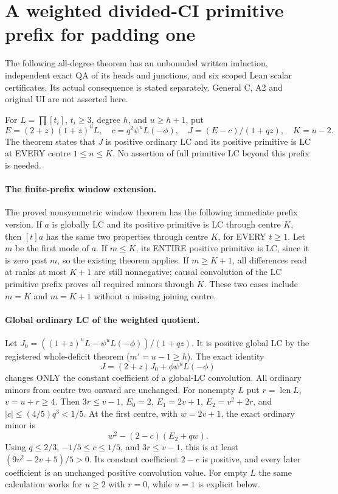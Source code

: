 \section{A weighted divided-CI primitive prefix for padding one}
The following all-degree theorem has an unbounded written induction,
independent exact QA of its heads and junctions, and six scoped Lean
scalar certificates. Its actual consequence is stated separately.
General C, A2 and original UI are not asserted here.

For $L=\prod[t_i]$, $t_i\ge3$, degree $h$, and $u\ge h+1$, put
\[
 E=(2+z)(1+z)^uL,\quad c=q^2\psi^uL(-\phi),\quad
 J=(E-c)/(1+qz),\quad K=u-2.
\]
The theorem states that $J$ is positive ordinary LC and
its positive primitive is LC at EVERY centre $1\le n\le K$.
No assertion of full primitive LC beyond this prefix is needed.

\paragraph{The finite-prefix window extension.}
The proved nonsymmetric window theorem has the following immediate
prefix version. If $a$ is globally LC and its positive primitive
is LC through centre $K$, then $[t]a$ has the same two properties
through centre $K$, for EVERY $t\ge1$.
Let $m$ be the first mode of $a$. If $m\le K$, its ENTIRE positive
primitive is LC, since it is zero past $m$, so the existing theorem
applies. If $m\ge K+1$, all differences read at ranks at most
$K+1$ are still nonnegative; causal convolution of the LC primitive
prefix proves all required minors through $K$. These two cases
include $m=K$ and $m=K+1$ without a missing joining centre.

\paragraph{Global ordinary LC of the weighted quotient.}
Let $J_0=((1+z)^uL-\psi^uL(-\phi))/(1+qz)$.
It is positive global LC by the registered whole-deficit theorem
($m'=u-1\ge h$). The exact identity
\[
 J=(2+z)J_0+\phi\psi^uL(-\phi)
\]
changes ONLY the constant coefficient of a global-LC convolution.
All ordinary minors from centre two onward are unchanged.
For nonempty $L$ put $r=\operatorname{len}L$, $v=u+r\ge4$.
Then $3r\le v-1$, $E_0=2$, $E_1=2v+1$, $E_2=v^2+2r$, and
$|c|\le(4/5)q^3<1/5$.
At the first centre, with $w=2v+1$, the exact ordinary minor is
\[
                   w^2-(2-c)(E_2+qw).
\]
Using $q\le2/3$, $-1/5\le c\le1/5$, and $3r\le v-1$, this
is at least $(9v^2-2v+5)/5>0$. Its constant coefficient
$2-c$ is positive, and every later coefficient is an unchanged
positive convolution value. For empty $L$ the same calculation
works for $u\ge2$ with $r=0$, while $u=1$ is explicit below.

